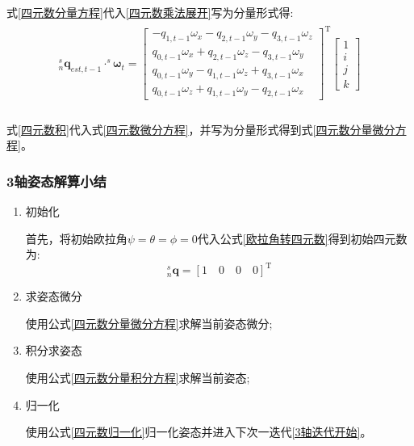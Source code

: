 式\ref{四元数分量方程}代入\ref{四元数乘法展开}写为分量形式得:
\begin{eqnarray}\label{四元数积}
    \begin{split} 
        ^s_n\bm{q}_{est,t-1}\cdot^s{\bm{\omega}}_t=
        \left[\begin{matrix}
                -q_{1,t-1}\omega_x-q_{2,t-1}\omega_y-q_{3,t-1}\omega_z \\
                 q_{0,t-1}\omega_x+q_{2,t-1}\omega_z-q_{3,t-1}\omega_y \\
                 q_{0,t-1}\omega_y-q_{1,t-1}\omega_z+q_{3,t-1}\omega_x \\
                 q_{0,t-1}\omega_z+q_{1,t-1}\omega_y-q_{2,t-1}\omega_x
        \end{matrix}\right]^\mathrm{T}
        \left[\begin{matrix}
                1 \\ i \\ j \\ k
        \end{matrix}\right] \\
    \end{split}
\end{eqnarray} 

式\ref{四元数积}代入式\ref{四元数微分方程}，并写为分量形式得到式\ref{四元数分量微分方程}。

\subsubsection{3轴姿态解算小结}\label{section:3轴姿态解算小结}
\begin{enumerate}
        \item 初始化 
            
            首先，将初始欧拉角$\psi=\theta=\phi=0$代入公式\ref{欧拉角转四元数}得到初始四元数为:
            \begin{equation}\label{四元数初始化}
                ^s_n\bm{q}=[1\quad 0\quad 0\quad 0]^\mathrm{T}
            \end{equation} 

        \item 求姿态微分\label{3轴迭代开始}
            
            使用公式\ref{四元数分量微分方程}求解当前姿态微分;

        \item 积分求姿态
            
            使用公式\ref{四元数分量积分方程}求解当前姿态; 

        \item 归一化 
            
            使用公式\ref{四元数归一化}归一化姿态并进入下次一迭代\ref{3轴迭代开始}。
\end{enumerate}

